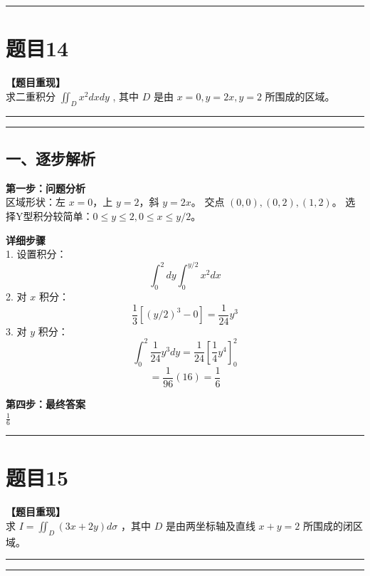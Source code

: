 \documentclass[12pt, a4paper]{ctexart}
\newcommand{\TopSeparator}{
    \par\noindent\rule{\textwidth}{1.5pt}\vspace{0.5em} %
}
\newcommand{\AnalysisSeparator}{
    \par\noindent\rule{\textwidth}{0.5pt}\vspace{0.2em}\hrule\vspace{0.5em} %
}
\newenvironment{RedAnalysis}{
    \par
    \color{red} %
}{
    \par
    \color{black} %
}
\begin{document}
\vspace{2em}

\TopSeparator
\section*{题目14}

\textbf{【题目重现】} \\
求二重积分 $ \iint_{D} x^{2} dx dy $ , 其中 $D$ 是由 $ x = 0, y = 2x, y = 2 $ 所围成的区域。

\AnalysisSeparator

\begin{RedAnalysis}

\subsection*{一、逐步解析}

\textbf{第一步：问题分析} \\
区域形状：左 $x=0$，上 $y=2$，斜 $y=2x$。
交点 $(0,0), (0,2), (1,2)$。
选择Y型积分较简单：$0 \le y \le 2, 0 \le x \le y/2$。

\textbf{详细步骤} \\
1. 设置积分：
   \[ \int_0^2 dy \int_0^{y/2} x^2 dx \]
2. 对 $x$ 积分：
   \[ \frac{1}{3} [(y/2)^3 - 0] = \frac{1}{24}y^3 \]
3. 对 $y$ 积分：
   \[ \int_0^2 \frac{1}{24}y^3 dy = \frac{1}{24} [\frac{1}{4}y^4]_0^2 \]
   \[ = \frac{1}{96} (16) = \frac{1}{6} \]

\textbf{第四步：最终答案} \\
$ \frac{1}{6} $

\end{RedAnalysis}

\vspace{2em}

\TopSeparator
\section*{题目15}

\textbf{【题目重现】} \\
求 $ I = \iint_{D} (3x + 2y) d\sigma $ ，其中 $D$ 是由两坐标轴及直线 $ x + y = 2 $ 所围成的闭区域。

\AnalysisSeparator
\end{document}
